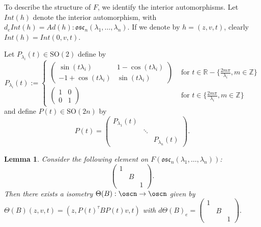 \documentclass[11pt]{amsart}
\theoremstyle{plain}
\newtheorem{lem}[thm]{Lemma}
\theoremstyle{definition}
\theoremstyle{remark}
\begin{document}
To describe the structure of $F$, we identify the interior automorphisms. Let $Int(h)$ denote the interior automorphism, with $d_e Int(h)=Ad(h): \mathfrak{osc}_n(\lambda_1, \hdots, \lambda_n)$. If we denote by $h=(z,v,t)$, clearly $Int(h)=Int(0,v,t)$.

Let $P_{\lambda_i}(t)\in \mathrm{SO}(2)$ define by
$$P_{\lambda_i}(t):=\left\{
	 \begin{array}{cl}
\left( \begin{matrix}
	\sin(t\lambda_i) & 1 -\cos(t\lambda_i)\\
-1 +\cos(t\lambda_i)  & \sin(t\lambda_i)
\end{matrix}\right) & \mbox{ for } t\in \mathbb R -\{\frac{2m\pi}{\lambda_i}, m\in \mathbb Z\}\\
 \left( \begin{matrix}
1 &0\\
0  & 1
\end{matrix}\right) & \mbox{ for } t\in\{\frac{2m\pi}{\lambda_i}, m\in \mathbb Z\}
\end{array}	
\right.
$$
and define $P(t)\in \mathrm{SO}(2n)$ by
$$P(t)=\left( \begin{matrix}
P_{\lambda_1}(t) & & \\
& \ddots & \\
& & P_{\lambda_n}(t)
\end{matrix}\right).$$

\begin{lem} Consider the following element on $F(\mathfrak{osc}_n(\lambda_1, \hdots, \lambda_n))$:
	$$\left( \begin{matrix}
	1 & & \\
	& B & \\
	& & 1
	\end{matrix}\right).$$
Then there exists a isometry $\Theta(B):\oscn \to \oscn$ given by
$\Theta(B)(z,v,t)=(z, P(t)^{\tau}BP(t)v, t)$ with $d \Theta(B)_e=\left( \begin{matrix}
1 & & \\
& B & \\
& & 1
\end{matrix}\right).$
\end{lem}
\end{document}
